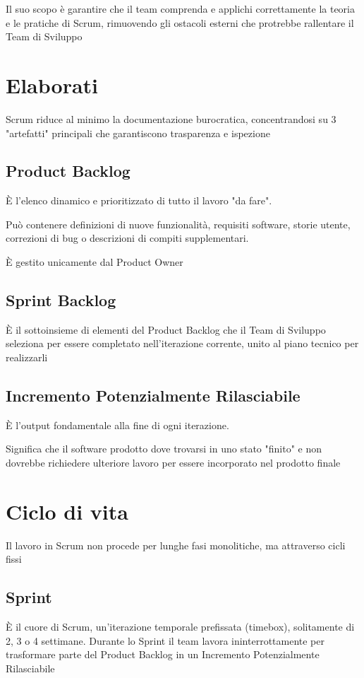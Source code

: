 Il suo scopo è garantire che il team comprenda e applichi correttamente la teoria e le pratiche di Scrum, rimuovendo gli ostacoli esterni che protrebbe rallentare il Team di Sviluppo

\section{Elaborati}
Scrum riduce al minimo la documentazione burocratica, concentrandosi su 3 "artefatti" principali che garantiscono trasparenza e ispezione

\subsection{Product Backlog}
È l'elenco dinamico e prioritizzato di tutto il lavoro "da fare".

Può contenere definizioni di nuove funzionalità, requisiti software, storie utente, correzioni di bug o descrizioni di compiti supplementari.

È gestito unicamente dal Product Owner

\subsection{Sprint Backlog}
È il sottoinsieme di elementi del Product Backlog che il Team di Sviluppo seleziona per essere completato nell'iterazione corrente, unito al piano tecnico per realizzarli

\subsection{Incremento Potenzialmente Rilasciabile}
È l'output fondamentale alla fine di ogni iterazione.

Significa che il software prodotto dove trovarsi in uno stato "finito" e non dovrebbe richiedere ulteriore lavoro per essere incorporato nel prodotto finale

\section{Ciclo di vita}
Il lavoro in Scrum non procede per lunghe fasi monolitiche, ma attraverso cicli fissi

\subsection{Sprint}
È il cuore di Scrum, un'iterazione temporale prefissata (timebox), solitamente di 2, 3 o 4 settimane. Durante lo Sprint il team lavora ininterrottamente per trasformare parte del Product Backlog in un Incremento Potenzialmente Rilasciabile

